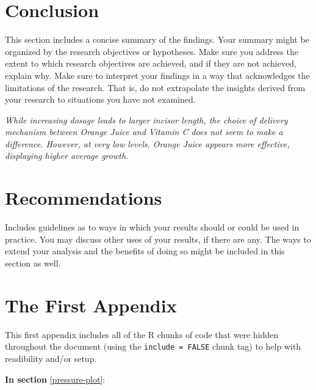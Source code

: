\documentclass[12pt,oneside]{chicagocapstone}
\begin{document}
\chapter*{Conclusion}\label{conclusion}

This section includes a concise summary of the findings. Your summary
might be organized by the research objectives or hypotheses. Make sure
you address the extent to which research objectives are achieved, and if
they are not achieved, explain why. Make sure to interpret your findings
in a way that acknowledges the limitations of the research. That is, do
not extrapolate the insights derived from your research to situations
you have not examined.

\emph{While increasing dosage leads to larger incisor length, the choice
of delivery mechanism between Orange Juice and Vitamin C does not seem
to make a difference. However, at very low levels, Orange Juice appears
more effective, displaying higher average growth.}

\chapter*{Recommendations}\label{recommendations}

Includes guidelines as to ways in which your results should or could be
used in practice. You may discuss other uses of your results, if there
are any. The ways to extend your analysis and the benefits of doing so
might be included in this section as well.

\appendix

\chapter{The First Appendix}\label{the-first-appendix}

This first appendix includes all of the R chunks of code that were
hidden throughout the document (using the \texttt{include\ =\ FALSE}
chunk tag) to help with readibility and/or setup.

\textbf{In section} \ref{pressure-plot}:
\end{document}
